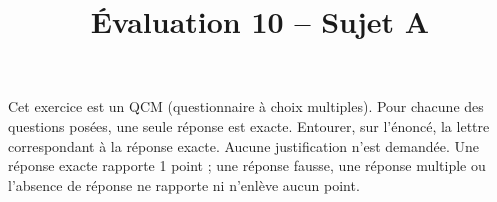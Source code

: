 \documentclass[a4paper,dvipsnames]{article}
\begin{document}
\title{Évaluation 10 -- Sujet A}
\author{}
\date{}

\maketitle{}

\pagestyle{empty}
\thispagestyle{empty}

\exo[4 points] Cet exercice est un QCM (questionnaire à choix multiples). Pour chacune des questions posées, une seule réponse est exacte. Entourer, sur l'énoncé, la lettre correspondant à la réponse exacte. Aucune justification n'est demandée. Une réponse exacte rapporte 1 point ; une réponse fausse, une réponse multiple ou l'absence de réponse ne rapporte ni n'enlève aucun point.

\end{document}
